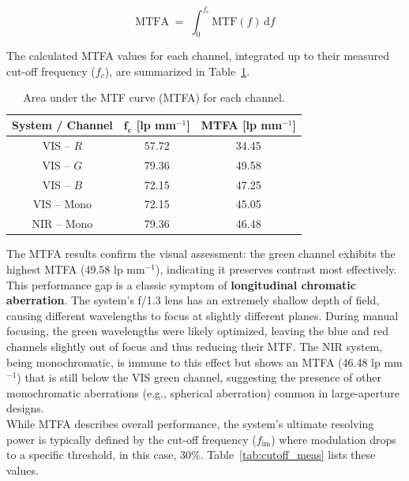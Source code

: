 \begin{equation}
\mathrm{MTFA} \;=\; \int_{0}^{f_c} \mathrm{MTF}(f)\,\mathrm{d}f
\label{eq:mtfa_def}
\end{equation}

\noindent The calculated MTFA values for each channel, integrated up to their measured cut-off frequency ($f_c$), are summarized in Table~\ref{tab:mtfa_results}.

\begin{table}[H]
    \centering
    \caption{Area under the MTF curve (MTFA) for each channel.}
    \label{tab:mtfa_results}
    \begin{tabular}{|c|c|c|}
    \hline
    \rowcolor[HTML]{EFEFEF}
    \textbf{System / Channel} & $\mathbf{f_c}$ [lp mm$^{-1}$] & \textbf{MTFA} [lp mm$^{-1}$] \\
    \hline
    VIS -- $R$     & 57.72 & 34.45 \\
    VIS -- $G$     & 79.36 & 49.58 \\
    VIS -- $B$     & 72.15 & 47.25 \\
    VIS -- Mono    & 72.15 & 45.05 \\
    NIR -- Mono    & 79.36 & 46.48 \\
    \hline
    \end{tabular}
\end{table}

\noindent The MTFA results confirm the visual assessment: the green channel exhibits the highest MTFA (49.58 lp mm$^{-1}$), indicating it preserves contrast most effectively. This performance gap is a classic symptom of \textbf{longitudinal chromatic aberration}. The system's f/1.3 lens has an extremely shallow depth of field, causing different wavelengths to focus at slightly different planes. During manual focusing, the green wavelengths were likely optimized, leaving the blue and red channels slightly out of focus and thus reducing their MTF. The NIR system, being monochromatic, is immune to this effect but shows an MTFA (46.48 lp mm$^{-1}$) that is still below the VIS green channel, suggesting the presence of other monochromatic aberrations (e.g., spherical aberration) common in large-aperture designs.\\

\noindent While MTFA describes overall performance, the system's ultimate resolving power is typically defined by the cut-off frequency ($f_{\text{im}}$) where modulation drops to a specific threshold, in this case, 30\%. Table~\ref{tab:cutoff_meas} lists these values.\\


